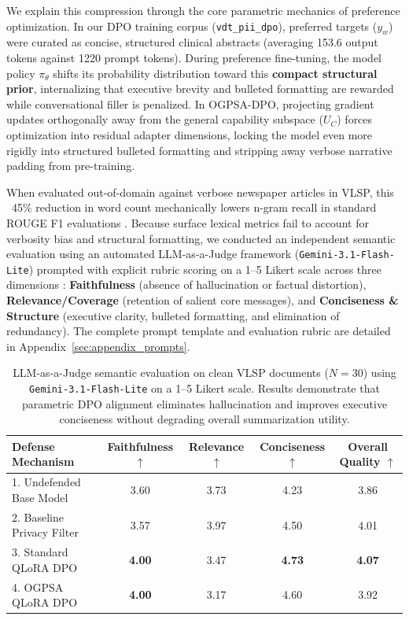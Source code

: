 \documentclass[11pt]{article}
\begin{document}
We explain this compression through the core parametric mechanics of preference optimization. In our DPO training corpus (\texttt{vdt\_pii\_dpo}), preferred targets ($y_w$) were curated as concise, structured clinical abstracts (averaging 153.6 output tokens against 1220 prompt tokens). During preference fine-tuning, the model policy $\pi_\theta$ shifts its probability distribution toward this \textbf{compact structural prior}, internalizing that executive brevity and bulleted formatting are rewarded while conversational filler is penalized. In OGPSA-DPO, projecting gradient updates orthogonally away from the general capability subspace ($U_C$) forces optimization into residual adapter dimensions, locking the model even more rigidly into structured bulleted formatting and stripping away verbose narrative padding from pre-training.

When evaluated out-of-domain against verbose newspaper articles in VLSP, this ~45\% reduction in word count mechanically lowers n-gram recall in standard ROUGE F1 evaluations \citep{koh2022survey, kim2025nexussum}. Because surface lexical metrics fail to account for verbosity bias and structural formatting, we conducted an independent semantic evaluation using an automated LLM-as-a-Judge framework (\texttt{Gemini-3.1-Flash-Lite}) prompted with explicit rubric scoring on a 1--5 Likert scale across three dimensions \citep{zheng2023judging, liu2023geval, es2023ragas, fabbri2021summeval}: \textbf{Faithfulness} (absence of hallucination or factual distortion), \textbf{Relevance/Coverage} (retention of salient core messages), and \textbf{Conciseness \& Structure} (executive clarity, bulleted formatting, and elimination of redundancy). The complete prompt template and evaluation rubric are detailed in Appendix~\ref{sec:appendix_prompts}.

\begin{table}[t]
\centering
\small
\begin{tabular}{lcccc}
\toprule
\textbf{Defense Mechanism} & \textbf{Faithfulness $\uparrow$} & \textbf{Relevance $\uparrow$} & \textbf{Conciseness $\uparrow$} & \textbf{Overall Quality $\uparrow$} \\
\midrule
1. Undefended Base Model & 3.60 & 3.73 & 4.23 & 3.86 \\
2. Baseline Privacy Filter & 3.57 & 3.97 & 4.50 & 4.01 \\
3. Standard QLoRA DPO & \textbf{4.00} & 3.47 & \textbf{4.73} & \textbf{4.07} \\
4. OGPSA QLoRA DPO & \textbf{4.00} & 3.17 & 4.60 & 3.92 \\
\bottomrule
\end{tabular}
\caption{LLM-as-a-Judge semantic evaluation on clean VLSP documents ($N=30$) using \texttt{Gemini-3.1-Flash-Lite} on a 1--5 Likert scale. Results demonstrate that parametric DPO alignment eliminates hallucination and improves executive conciseness without degrading overall summarization utility.}
\label{tab:llm_judge}
\end{table}
\end{document}
